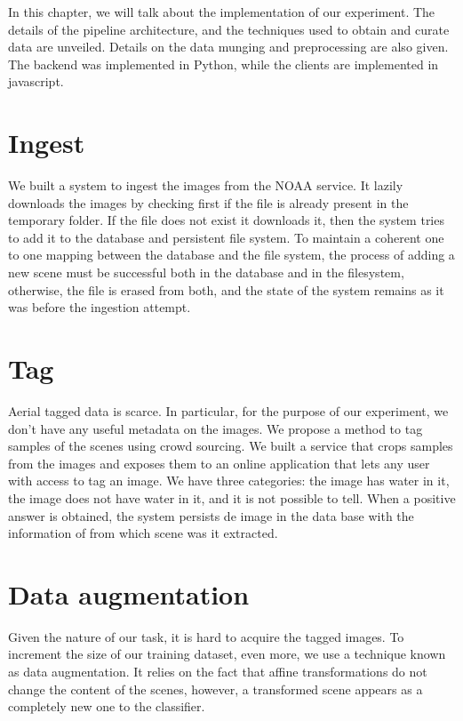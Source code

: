 In this chapter, we will talk about the implementation of our experiment. The details of the pipeline architecture, and the techniques used to obtain and curate data are unveiled. Details on the data munging and preprocessing are also given. The backend was implemented in Python, while the clients are implemented in javascript.\\

\section{Ingest}

We built a system to ingest the images from the NOAA service. It lazily downloads the images by checking first if the file is already present in the temporary folder. If the file does not exist it downloads it, then the system tries to add it to the database and persistent file system. To maintain a coherent one to one mapping between the database and the file system, the process of adding a new scene must be successful both in the database and in the filesystem, otherwise, the file is erased from both, and the state of the system remains as it was before the ingestion attempt.\\

\section{Tag}

Aerial tagged data is scarce. In particular, for the purpose of our experiment, we don't have any useful metadata on the images. We propose a method to tag samples of the scenes using crowd sourcing. We built a service that crops samples from the images and exposes them to an online application that lets any user with access to tag an image. We have three categories: the image has water in it, the image does not have water in it, and it is not possible to tell. When a positive answer is obtained, the system persists de image in the data base with the information of from which scene was it extracted.\\


\section{Data augmentation}

Given the nature of our task, it is hard to acquire the tagged images. To increment the size of our training dataset, even more, we use a technique known as data augmentation. It relies on the fact that affine transformations do not change the content of the scenes, however, a transformed scene appears as a completely new one to the classifier.\\

